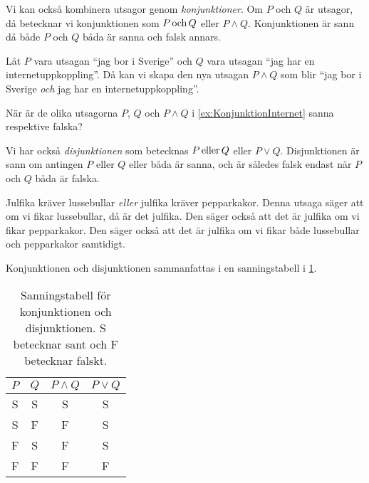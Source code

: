 Vi kan också kombinera utsagor genom \emph{konjunktioner}.
Om \(P\) och \(Q\) är utsagor, då betecknar vi konjunktionen som \(P\operatorname{och} Q\)
eller \(P\land Q\).
Konjunktionen är sann då både \(P\) och \(Q\) båda är sanna och falsk annars.
\begin{example}\label{ex:KonjunktionInternet}
  Låt \(P\) vara utsagan \enquote{jag bor i Sverige} och \(Q\) vara utsagan 
  \enquote{jag har en internetuppkoppling}.
  Då kan vi skapa den nya utsagan \(P\land Q\) som blir \enquote{jag bor 
    i Sverige \emph{och} jag har en internetuppkoppling}.
\end{example}

\begin{exercise}
  När är de olika utsagorna \(P\), \(Q\) och \(P\land Q\) i
  \cref{ex:KonjunktionInternet} sanna respektive falska?
\end{exercise}

Vi har också \emph{disjunktionen} som betecknas \(P\operatorname{eller} Q\) 
eller \(P\lor Q\).
Disjunktionen är sann om antingen \(P\) eller \(Q\) eller båda är sanna, och är
således falsk endast när \(P\) och \(Q\) båda är falska.
\begin{example}
  Julfika kräver lussebullar \emph{eller} julfika kräver pepparkakor.
  Denna utsaga säger att om vi fikar lussebullar, då är det julfika.
  Den säger också att det är julfika om vi fikar pepparkakor.
  Den säger också att det är julfika om vi fikar både lussebullar och 
  pepparkakor samtidigt.
\end{example}

Konjunktionen och disjunktionen sammanfattas i en sanningstabell i
\cref{tbl:SanningKonjunktionDisjunktion}.

\begin{table}
  \caption{%
    Sanningstabell för konjunktionen och disjunktionen.
    S betecknar sant och F betecknar falskt.
  }
  \begin{tabular}{cccc}
    \(P\)  & \(Q\)   & \(P\land Q\)  & \(P\lor Q\) \\
    \toprule
    S      &  S      & S             & S \\
    S      &  F      & F             & S \\
    F      &  S      & F             & S \\
    F      &  F      & F             & F \\
    \bottomrule
  \end{tabular}\label{tbl:SanningKonjunktionDisjunktion}
\end{table}

